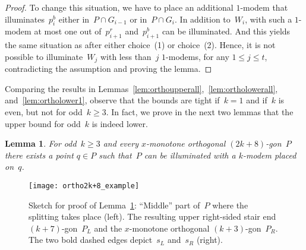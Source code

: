 \documentclass[A4]{article}
\newtheorem{lemma}[theorem]{Lemma}
\begin{document}
\begin{proof}
To change this situation, we have to place an additional \mbox{$1$-modem} that illuminates~$p^b_{i}$ either in~$P\cap G_{i-1}$ or in~$P\cap G_i$.
In addition to~$W_{i}$, with such a \mbox{$1$-modem} at most one out of~$p^r_{i+1}$ and~$p^b_{i+1}$ can be illuminated.
And this yields the same situation as after either choice~(1) or choice~(2).
Hence, it is not possible to illuminate~$W_j$ with less than~$j$ \mbox{$1$-modems}, for any $1 \leq j \leq t$, contradicting the assumption and proving the lemma.
\end{proof}


Comparing the results in Lemmas~\ref{lem:orthoupperall},~\ref{lem:ortholowerall}, and~\ref{lem:ortholower1}, observe that the bounds are tight if~$k=1$ and if~$k$ is even, but not for odd~$k\geq3$.
In fact, we prove in the next two lemmas that the upper bound for odd~$k$ is indeed lower.


\begin{lemma}\label{lem:2k+8}
For odd~$k\geq3$ and every $x$-monotone orthogonal $(2k+8)$-gon~$P$ there exists a point $q\in P$ such that~$P$ can be illuminated with a \mbox{$k$-modem} placed on~$q$.
\end{lemma}

\begin{figure}[htb]
  \centering
  \texttt{[image: ortho2k+8\_example]}
  \caption{Sketch for proof of Lemma~\ref{lem:2k+8}:
	  ``Middle'' part of~$P$ where the splitting takes place (left).
      The resulting upper right-sided stair end $(k+7)$-gon~$P_L$ and the $x$-monotone orthogonal $(k+3)$-gon~$P_R$. The two bold dashed edges depict~$s_L$ and~$s_R$ (right).}
 \label{fig:ortho2k+8}
\end{figure}
\end{document}
